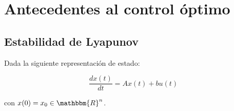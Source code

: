 
\chapter{Antecedentes al control óptimo}


    \section{Estabilidad de Lyapunov}

        Dada la siguiente representación de estado:

        \begin{equation} \label{eq:lyap1}
            \frac{dx(t)}{dt} = A x(t) + b u(t)
        \end{equation}

        con $x(0) = x_0  \in \mathbbm{R}^n$.

